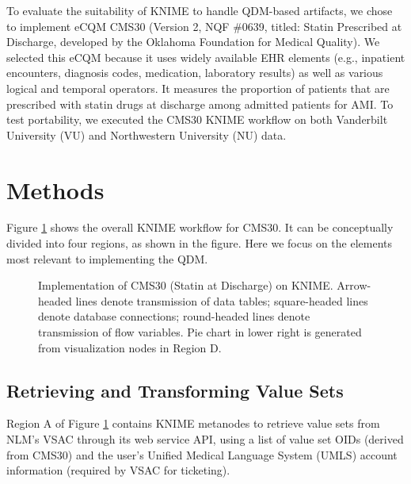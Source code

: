 \documentclass{article}
\begin{document}
To evaluate the suitability of KNIME to handle QDM-based artifacts, we chose to implement eCQM CMS30 (Version 2, NQF \#0639, titled: Statin Prescribed at Discharge\cite{krumholz_acc/aha_2008}, developed by the Oklahoma Foundation for Medical Quality). We selected this eCQM because it uses widely available EHR elements (e.g., inpatient encounters, diagnosis codes, medication, laboratory results) as well as various logical and temporal operators. It measures the proportion of patients that are prescribed with statin drugs at discharge among admitted patients for AMI. To test portability, we executed the CMS30 KNIME workflow on both Vanderbilt University (VU) and Northwestern University (NU) data.

\section{Methods}

Figure \ref{fig:knime-snapshot-1} shows the overall KNIME workflow for CMS30. It can be conceptually divided into four regions, as shown in the figure. Here we focus on the elements most relevant to implementing the QDM.

\begin{figure}
\centering
	\caption{Implementation of CMS30 (Statin at Discharge) on KNIME. Arrow-headed lines denote transmission of data tables; square-headed lines denote database connections; round-headed lines denote transmission of flow variables. Pie chart in lower right is generated from visualization nodes in Region D.
	}\label{fig:knime-snapshot-1}
\end{figure}

\subsection{Retrieving and Transforming Value Sets}

Region A of Figure \ref{fig:knime-snapshot-1} contains KNIME metanodes to retrieve value sets from NLM's VSAC through its web service API, using a list of value set OIDs (derived from CMS30) and the user's Unified Medical Language System (UMLS) account information (required by VSAC for ticketing).
\end{document}
